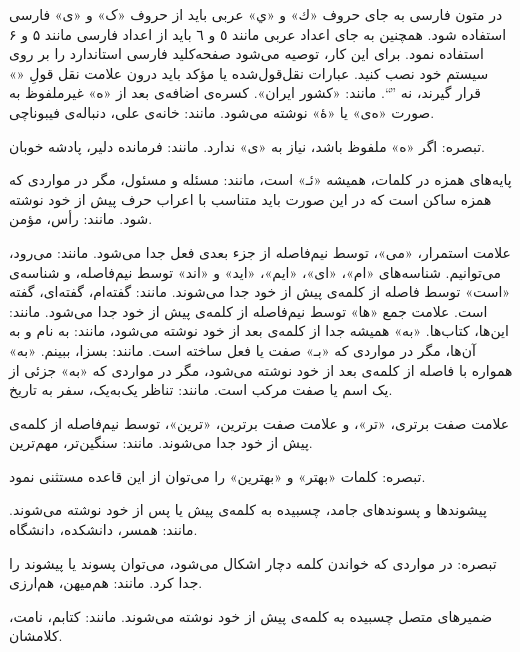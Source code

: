 

در متون فارسی به جای حروف «ك» و «ي» عربی باید از حروف «ک» و «ی» فارسی استفاده شود. همچنین به جای اعداد عربی مانند ٥ و ٦ باید از اعداد فارسی مانند ۵ و ۶ استفاده نمود. 
برای این کار، توصیه می‌شود صفحه‌کلید‌ فارسی استاندارد را بر روی سیستم خود نصب کنید.
عبارات نقل‌قول‌شده یا مؤکد باید درون علامت نقل قولِ «» قرار گیرند، نه ''``. مانند: «کشور ایران».
کسره‌ی اضافه‌ی بعد از «ه» غیرملفوظ به صورت «ه‌ی» یا «هٔ» نوشته می‌شود. مانند: خانه‌ی علی، دنباله‌ی فیبوناچی.

        تبصره‌: اگر «ه» ملفوظ باشد، نیاز به «‌ی» ندارد. مانند: فرمانده دلیر، پادشه خوبان. 

پایه‌های همزه در کلمات، همیشه «ئـ» است، مانند: مسئله و مسئول، مگر در مواردی که همزه ساکن است که در این ‌صورت باید متناسب با اعراب حرف پیش از خود نوشته شود. مانند: رأس، مؤمن. 






علامت استمرار، «می»، توسط نیم‌فاصله از جزء‌ بعدی فعل جدا می‌شود. مانند: می‌رود، می‌توانیم.
شناسه‌های «ام»، «ای»، «ایم»، «اید» و «اند» توسط نیم‌فاصله، و شناسه‌ی «است» توسط فاصله از کلمه‌ی پیش از خود جدا می‌شوند. مانند: گفته‌ام، گفته‌ای، گفته است.
علامت جمع «ها» توسط نیم‌فاصله از کلمه‌ی پیش از خود جدا می‌شود. مانند: این‌ها، کتاب‌ها.
«به» همیشه جدا از کلمه‌ی بعد از خود نوشته می‌شود، مانند: به‌ نام و به آن‌ها، مگر در مواردی که «بـ» صفت یا فعل ساخته است. مانند: بسزا، ببینم.
«به» همواره با فاصله از کلمه‌ی بعد از خود نوشته می‌شود، مگر در مواردی که «به» جزئی از یک اسم یا صفت مرکب است. مانند: تناظر یک‌به‌یک، سفر به تاریخ. 
%
%
%

%

علامت صفت برتری، «تر»، و علامت صفت برترین، «ترین»، توسط نیم‌فاصله از کلمه‌ی پیش از خود جدا می‌شوند. 
مانند: سنگین‌تر، مهم‌ترین.

        تبصره‌: کلمات «بهتر» و «بهترین» را می‌توان از این قاعده مستثنی نمود. 

پیشوندها و پسوندهای جامد، چسبیده به کلمه‌ی پیش یا پس از خود نوشته می‌شوند. مانند: همسر، دانشکده، دانشگاه.

        تبصره‌: در مواردی که خواندن کلمه دچار اشکال می‌شود، می‌توان پسوند یا پیشوند را جدا کرد. مانند: هم‌میهن، هم‌ارزی. 

ضمیرهای متصل چسبیده به کلمه‌ی پیش‌ از خود نوشته می‌شوند. مانند: کتابم، نامت، کلامشان. 


